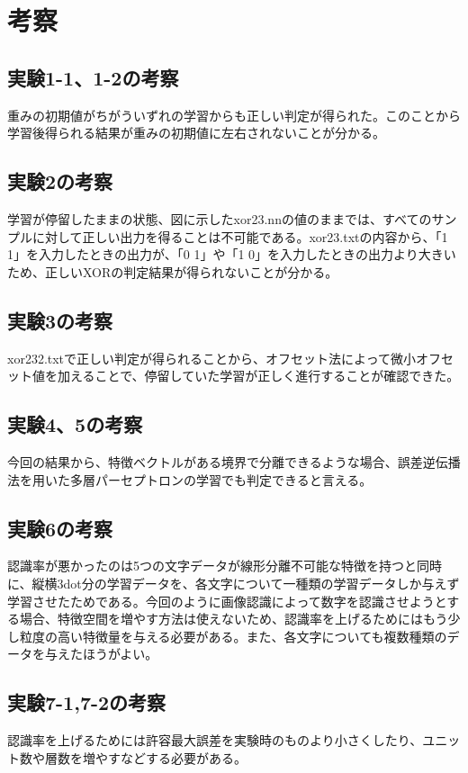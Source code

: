 \documentclass[final]{jarticle}[2012/05/15]
\begin{document}
\section{考察}
\subsection{実験1-1、1-2の考察}
重みの初期値がちがういずれの学習からも正しい判定が得られた。このことから学習後得られる結果が重みの初期値に左右されないことが分かる。\par
\subsection{実験2の考察}
学習が停留したままの状態、図に示したxor23.nnの値のままでは、すべてのサンプルに対して正しい出力を得ることは不可能である。xor23.txtの内容から、「1 1」を入力したときの出力が、「0 1」や「1 0」を入力したときの出力より大きいため、正しいXORの判定結果が得られないことが分かる。\par
\subsection{実験3の考察}
xor232.txtで正しい判定が得られることから、オフセット法によって微小オフセット値を加えることで、停留していた学習が正しく進行することが確認できた。
\subsection{実験4、5の考察}
今回の結果から、特徴ベクトルがある境界で分離できるような場合、誤差逆伝播法を用いた多層パーセプトロンの学習でも判定できると言える。
\subsection{実験6の考察}
認識率が悪かったのは5つの文字データが線形分離不可能な特徴を持つと同時に、縦横3dot分の学習データを、各文字について一種類の学習データしか与えず学習させたためである。今回のように画像認識によって数字を認識させようとする場合、特徴空間を増やす方法は使えないため、認識率を上げるためにはもう少し粒度の高い特徴量を与える必要がある。また、各文字についても複数種類のデータを与えたほうがよい。
\subsection{実験7-1,7-2の考察}
認識率を上げるためには許容最大誤差を実験時のものより小さくしたり、ユニット数や層数を増やすなどする必要がある。
\end{document}
